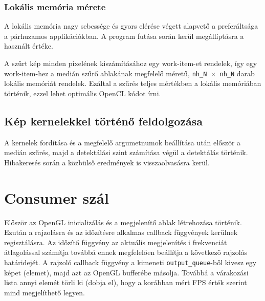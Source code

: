 	\subsubsection{Lokális memória mérete}
	A lokális memória nagy sebessége és gyors elérése végett alapvető a preferáltsága a párhuzamos applikációkban.
	A program futása során kerül megállíptásra a használt értéke.
	
	A szűrt kép minden pixelének kiszámításához egy work-item-et rendelek, így egy work-item-hez a medián szűrő ablakának megfelelő
	méretű, \texttt{nh\_N $\times$ nh\_N} darab lokális memóriát rendelek. Ezáltal a szűrés teljes mértékben a lokális memóriában
	történik, ezzel lehet optimális OpenCL kódot írni.
	
	\subsection{Kép kernelekkel történő feldolgozása}
	A kernelek fordítása és a megfelelő argumetnumok beállítása után először a medián szűrés, majd a detektálási szint számítása
	végül a detektálás történik. Hibakeresés során a közbülső eredmények is visszaolvasásra kerül.
	
	
\section{Consumer szál}
	Először az OpenGL inicializálás és a megjelenítő ablak létrehozása történik. 
	Ezután a rajzolásra és az időzítésre alkalmas callback függvények kerülnek regisztálásra. Az időzítő függvény az aktuális
	megjelenítés i frekvenciát átlagolással számítja továbbá ennek megfelelően beállítja a következő rajzolás határidejét. A rajzoló
	callback függvény a kimeneti \texttt{output\_queue}-ből kivesz egy képet (elemet), majd azt az OpenGL bufferébe másolja. Továbbá
	a várakozási lista annyi elemét törli ki (dobja el), hogy a korábban mért FPS érték szerint mind megjelíthető legyen.  